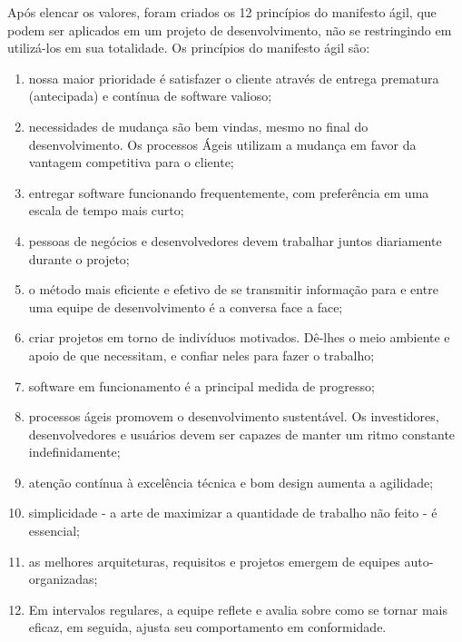 Após elencar os valores, foram criados os 12 princípios do manifesto ágil, que podem ser aplicados em um projeto de desenvolvimento, não se restringindo em utilizá-los em sua totalidade. Os princípios do manifesto ágil são:

\begin{enumerate}

\item nossa maior prioridade é satisfazer o cliente através de entrega prematura (antecipada) e contínua de software valioso;

\item necessidades de mudança são bem vindas, mesmo no final do desenvolvimento. Os processos Ágeis utilizam a mudança em favor da vantagem competitiva para o cliente;

\item entregar software funcionando frequentemente, com preferência em uma escala de tempo mais curto;

\item pessoas de negócios e desenvolvedores devem trabalhar juntos diariamente durante o projeto;

\item o método mais eficiente e efetivo de se transmitir informação para e entre uma equipe de desenvolvimento é a conversa face a face;

\item criar projetos em torno de indivíduos motivados. Dê-lhes o meio ambiente e apoio de que necessitam, e confiar neles para fazer o trabalho;

\item software em funcionamento é a principal medida de progresso;

\item processos ágeis promovem o desenvolvimento sustentável. Os investidores, desenvolvedores e usuários devem ser capazes de manter um ritmo constante indefinidamente;

\item atenção contínua à excelência técnica e bom design aumenta a agilidade;

\item simplicidade - a arte de maximizar a quantidade de trabalho não feito - é essencial;

\item as melhores arquiteturas, requisitos e projetos emergem de equipes auto-organizadas;

\item Em intervalos regulares, a equipe reflete e avalia sobre como se tornar mais eficaz, em seguida, ajusta seu comportamento em conformidade.

\end{enumerate}

